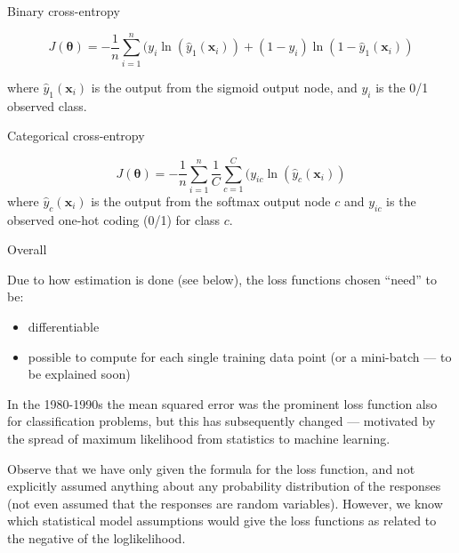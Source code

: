 \documentclass[10pt,ignorenonframetext,]{beamer}
\providecommand{\tightlist}{%
  \setlength{\itemsep}{0pt}\setlength{\parskip}{0pt}}
\begin{document}
\begin{frame}

\begin{block}{Binary cross-entropy}

\[ J({\boldsymbol \theta})=-\frac{1}{n}\sum_{i=1}^n (y_i\ln({\hat{y}_1({\boldsymbol x}_i)})+(1-y_i)\ln(1-{\hat{y}_1({\boldsymbol x}_i)})\]

where \(\hat{y}_1({\boldsymbol x}_i)\) is the output from the sigmoid
output node, and \(y_i\) is the 0/1 observed class.

\end{block}

\end{frame}

\begin{frame}

\begin{block}{Categorical cross-entropy}

\[ J({\boldsymbol \theta})=-\frac{1}{n}\sum_{i=1}^n\frac{1}{C} \sum_{c=1}^C (y_{ic}\ln({\hat{y}_c({\boldsymbol x}_i)})\]
where \(\hat{y}_c({\boldsymbol x}_i)\) is the output from the softmax
output node \(c\) and \(y_{ic}\) is the observed one-hot coding (0/1)
for class \(c\).

\end{block}

\end{frame}

\begin{frame}

\begin{block}{Overall}

Due to how estimation is done (see below), the loss functions chosen
``need'' to be:

\begin{itemize}
\tightlist
\item
  differentiable
\item
  possible to compute for each single training data point (or a
  mini-batch --- to be explained soon)
\end{itemize}

In the 1980-1990s the mean squared error was the prominent loss function
also for classification problems, but this has subsequently changed ---
motivated by the spread of maximum likelihood from statistics to machine
learning.

Observe that we have only given the formula for the loss function, and
not explicitly assumed anything about any probability distribution of
the responses (not even assumed that the responses are random
variables). However, we know which statistical model assumptions would
give the loss functions as related to the negative of the loglikelihood.

\end{block}

\end{frame}
\end{document}
